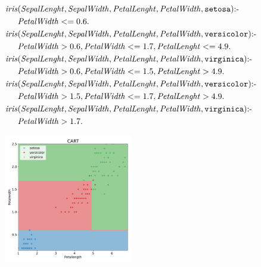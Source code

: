 \documentclass[presentation]{beamer}\mode<presentation>{\usetheme{AMSBolognaFC}}
\begin{document}
\begin{frame}[allowframebreaks]{\skilong}
    \begin{equation*}
        \begin{aligned}
            \mathit{iris}&(\mathit{SepalLenght}, \mathit{SepalWidth}, \mathit{PetalLenght}, \mathit{PetalWidth}, \mathtt{setosa})\text{:-}\\
            &\mathit{PetalWidth} <= 0.6.\\
            \mathit{iris}&(\mathit{SepalLenght}, \mathit{SepalWidth}, \mathit{PetalLenght}, \mathit{PetalWidth}, \mathtt{versicolor}) \text{:-}\\
            &\mathit{PetalWidth} > 0.6, \mathit{PetalWidth} <= 1.7, \mathit{PetalLenght} <= 4.9.\\
            \mathit{iris}&(\mathit{SepalLenght}, \mathit{SepalWidth}, \mathit{PetalLenght}, \mathit{PetalWidth}, \mathtt{virginica}) \text{:-}\\
            &\mathit{PetalWidth} > 0.6, \mathit{PetalWidth} <= 1.5, \mathit{PetalLenght} > 4.9.\\
            \mathit{iris}&(\mathit{SepalLenght}, \mathit{SepalWidth}, \mathit{PetalLenght}, \mathit{PetalWidth}, \mathtt{versicolor}) \text{:-}\\
            &\mathit{PetalWidth} > 1.5, \mathit{PetalWidth} <= 1.7, \mathit{PetalLenght} > 4.9.\\
            \mathit{iris}&(\mathit{SepalLenght}, \mathit{SepalWidth}, \mathit{PetalLenght}, \mathit{PetalWidth}, \mathtt{virginica}) \text{:-}\\
            &\mathit{PetalWidth} > 1.7.\\
        \end{aligned}
    \end{equation*}

     \framebreak
    
    \begin{figure}
        \centering
        \includegraphics[width=0.5\textwidth]{figures/iris-plot.pdf}
    \end{figure}
    

\end{frame}
\end{document}
